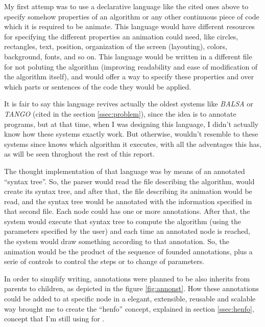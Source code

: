 \documentclass{article}
\begin{document}
My first attemp was to use a declarative language like the cited ones above to
specify somehow properties of an algorithm or any other continuous piece of code
which it is required to be animate. This language would have different resources
for specifying the different properties an animation could need, like circles,
rectangles, text, position, organization of the screen (layouting), colors,
background, fonts, and so on. This language would be written in a different file
for not poluting the algorithm (improving readability and ease of modification
of the algorithm itself), and would offer a way to specify these properties and
over which parts or sentences of the code they would be applied.

It is fair to say this language revives actually the oldest systems like
\textit{BALSA} or \textit{TANGO} (cited in the section \ref{ssec:problem}),
since the idea is to annotate programs, but at that time, when I was designing
this language, I didn't actually know how these systems exactly work. But
otherwise, \fav wouldn't resemble to these systems since \fav knows which
algorithm it executes, with all the adventages this has, as will be seen
throghout the rest of this report.

The thought implementation of that language was by means of an annotated
``syntax tree''. So, the parser would read the file describing the algorithm,
would create its syntax tree, and after that, the file describing its animation
would be read, and the syntax tree would be annotated with the information
specified in that second file. Each node could has one or more
annotations. After that, the system would execute that syntax tree to compute
the algorithm (using the parameters specified by the user) and each time an
annotated node is reached, the system would draw something according to that
annotation. So, the animation would be the product of the sequence of founded
annotations, plus a serie of controls to control the steps or to change of
parameters.

In order to simplify writing, annotations were planned to be also inherits from
parents to children, as depicted in the figure \ref{fig:annonst}. How these
annotations could be added to at specific node in a elegant, extensible,
reusable and scalable way brought me to create the ``henfo'' concept, explained
in section \ref{ssec:henfo}, concept that I'm still using for \fav.
\end{document}
